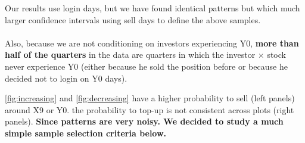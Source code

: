 \documentclass[
	USenglish,12pt,paper=a4,numbers=noenddot,abstract=on,
	final,%
	fullsample,
    ]{scrartcl}
\begin{document}
Our results use login days, but we have found identical patterns but which much larger confidence intervals using sell days to define the above samples. \\ \\
Also, because we are not conditioning on investors experiencing Y0,\textbf{ more than half of the quarters} in the data are quarters in which the investor $\times$ stock never experience Y0 (either because he sold the position before or because he decided not to login on Y0 days).

\ref{fig:increasing} and \ref{fig:decreasing} have a higher probability to sell (left panels) around X9 or Y0. the probability to top-up is not consistent across plots (right panels). \textbf{Since patterns are very noisy. We decided to study a much simple sample selection criteria below.}
\end{document}
